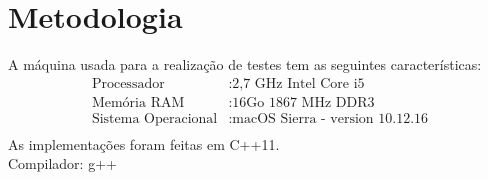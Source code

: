 \section{Metodologia}
A máquina usada para a realização de testes tem as seguintes características:\\
\begin{align*}
	\text{Processador}&: \text{2,7 GHz Intel Core i5}\\
	\text{Memória RAM}&: \text{16Go 1867 MHz DDR3}\\
	\text{Sistema Operacional}&: \text{macOS Sierra - version 10.12.16}\\
\end{align*}
As implementações foram feitas em C++11.\\
Compilador: g++\\
